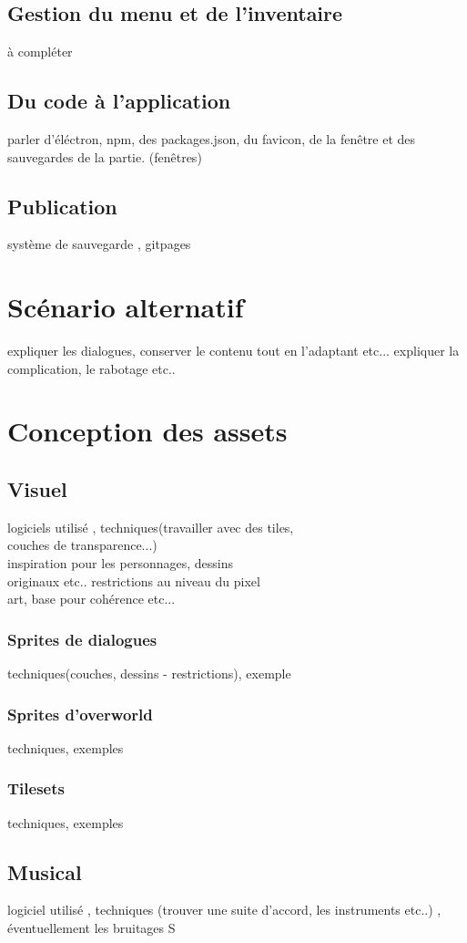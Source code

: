 \documentclass[11pt]{article}
\begin{document}
\subsection{Gestion du menu et de l'inventaire}
à compléter
\subsection{Du code à l'application}
parler d'éléctron, npm, des packages.json, du favicon, de la fenêtre et des sauvegardes de la partie. (fenêtres)

\subsection{Publication}
système de sauvegarde , gitpages
\section{Scénario alternatif}
expliquer les dialogues, conserver le contenu tout en l'adaptant etc...
expliquer la complication, le rabotage etc..
\section{Conception des assets}
\subsection{Visuel}
logiciels utilisé , techniques(travailler avec des tiles, \\ couches de transparence...)\\ inspiration pour les personnages, dessins\\ originaux etc.. restrictions au niveau du pixel\\ art, base pour cohérence etc...
\subsubsection{Sprites de dialogues}
techniques(couches, dessins - restrictions), exemple 
\subsubsection{Sprites d'overworld}
techniques, exemples
\subsubsection{Tilesets}
techniques, exemples
\subsection{Musical}
logiciel utilisé , techniques (trouver une suite d'accord, les instruments etc..) , éventuellement les bruitages 
S
\end{document}
